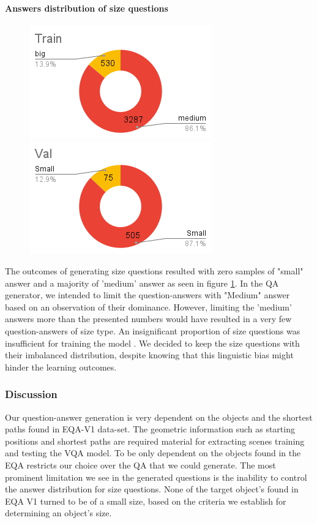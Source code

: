 \paragraph{Answers distribution of size questions}

\begin{figure}[H]
\includegraphics[scale=0.45]{latex/images/TrAnSi.png}
\includegraphics[scale=0.45]{latex/images/VlAnSi.png}
\caption{}
\label{fig:AnsDist}
\end{figure}

The outcomes of generating size questions resulted with zero samples of "small" answer and a majority of 'medium' answer as seen in figure \ref{fig:AnsDist}. In the QA generator, we intended to limit the question-answers with "Medium" answer based on an observation of their dominance. However, limiting the 'medium' answers more than the presented numbers would have resulted in a very few question-answers of size type. An insignificant proportion of size questions was insufficient for training the model . We decided to keep the size questions with their imbalanced distribution, despite knowing that this linguistic bias might hinder the learning outcomes.  

\subsubsection{Discussion}

Our question-answer generation is very dependent on the objects and the shortest paths found in EQA-V1 data-set. The geometric information such as  starting positions and shortest paths are required material for extracting scenes training and testing the VQA model. To be only dependent on the objects found in the EQA restricts our choice over the QA that we could generate. The most prominent limitation we see in the generated questions is the inability to control the answer distribution for size questions. None of the target object's found in EQA V1 turned to be of a small size, based on the criteria we establish for determining an object's size. 

